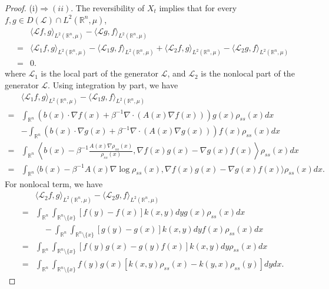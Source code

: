 \documentclass[10pt]{article}
\theoremstyle{definition}
\theoremstyle{remark}
\numberwithin{equation}{section}
\begin{document}
\begin{proof}
(i)$ \Rightarrow (ii)$. The reversibility of $X_{t}$ implies that for every $f,g \in D(\mathcal{L}) \cap L^2(\mathbb{R}^n, \mu)$,
\begin{align*}
    & \langle \mathcal{L}f,g\rangle_{L^2(\mathbb{R}^n, \mu)} -\langle \mathcal{L}g,f\rangle_{L^2(\mathbb{R}^n, \mu)}  \\
    = &  \langle \mathcal{L}_{1}f,g\rangle_{L^2(\mathbb{R}^n, \mu)}-\langle \mathcal{L}_{1}g,f\rangle_{L^2(\mathbb{R}^n, \mu)} +\langle \mathcal{L}_{2}f,g\rangle_{L^2(\mathbb{R}^n, \mu)}  - \langle \mathcal{L}_{2}g,f\rangle_{L^2(\mathbb{R}^n, \mu)} \\
    = &0.
\end{align*}
where $\mathcal{L}_{1}$ is the local part of the generator $\mathcal{L}$, and $\mathcal{L}_{2}$ is the nonlocal part of the generator $\mathcal{L}$.
Using integration by part, we have
\begin{align*}
    & \langle\mathcal{L}_{1}f,g\rangle_{L^2(\mathbb{R}^n, \mu)}-\langle \mathcal{L}_{1}g,f\rangle_{L^2(\mathbb{R}^n, \mu)} \\
    = & \int_{\mathbb{R}^n} ( b(x)\cdot \nabla f(x) + \beta^{-1} \nabla\cdot (A(x)\nabla f(x))) g(x) \rho_{ss}(x)dx \\
    & - \int_{\mathbb{R}^n} ( b(x)\cdot \nabla g(x) + \beta^{-1} \nabla\cdot (A(x)\nabla g(x))) f(x) \rho_{ss}(x)dx \\
    = & \int_{\mathbb{R}^n} \left\langle b(x) - \beta^{-1}\frac{A(x)\nabla\rho_{ss}(x)}{\rho_{ss}(x)}, \nabla f(x)g(x) - \nabla g(x) f(x) \right\rangle \rho_{ss}(x) dx \\
    = & \int_{\mathbb{R}^n} \langle b(x) - \beta^{-1}A(x)\nabla \log \rho_{ss}(x), \nabla f(x)g(x) - \nabla g(x) f(x)\rangle \rho_{ss}(x) dx.
\end{align*}
For nonlocal term, we have
\begin{align*}
    & \langle \mathcal{L}_{2}f,g\rangle_{L^2(\mathbb{R}^n, \mu)}- \langle \mathcal{L}_{2}g,f\rangle_{L^2(\mathbb{R}^n, \mu)}  \\
    = & \int_{\mathbb{R}^n} \int_{\mathbb{R}^{n}\setminus \{x\}} [f(y) - f(x)] k(x,y)dy g(x)\rho_{ss}(x)dx \\
    & \quad - \int_{\mathbb{R}^n} \int_{\mathbb{R}^{n}\setminus \{x\}} [g(y) - g(x)] k(x,y)dy f(x)\rho_{ss}(x)dx \\
    = & \int_{\mathbb{R}^n} \int_{\mathbb{R}^{n}\setminus \{x\}} [f(y)g(x) - g(y)f(x)] k(x,y)dy \rho_{ss}(x)dx \\
    = & \int_{\mathbb{R}^n} \int_{\mathbb{R}^{n}\setminus \{x\}} f(y)g(x)  [ k(x,y)\rho_{ss}(x) - k(y,x)\rho_{ss}(y)]dy dx.

\end{align*}
\end{proof}
\end{document}
